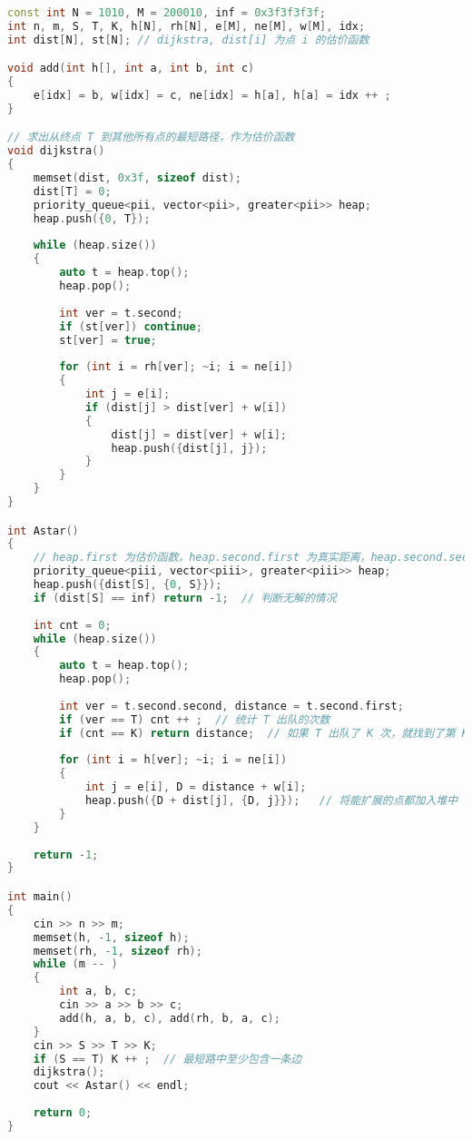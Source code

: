 \begin{lstlisting}[language=cpp]
const int N = 1010, M = 200010, inf = 0x3f3f3f3f;
int n, m, S, T, K, h[N], rh[N], e[M], ne[M], w[M], idx;
int dist[N], st[N]; // dijkstra, dist[i] 为点 i 的估价函数

void add(int h[], int a, int b, int c)
{
    e[idx] = b, w[idx] = c, ne[idx] = h[a], h[a] = idx ++ ;
}

// 求出从终点 T 到其他所有点的最短路径，作为估价函数
void dijkstra()
{
    memset(dist, 0x3f, sizeof dist);
    dist[T] = 0;
    priority_queue<pii, vector<pii>, greater<pii>> heap;
    heap.push({0, T});
    
    while (heap.size())
    {
        auto t = heap.top();
        heap.pop();
        
        int ver = t.second;
        if (st[ver]) continue;
        st[ver] = true;
        
        for (int i = rh[ver]; ~i; i = ne[i])
        {
            int j = e[i];
            if (dist[j] > dist[ver] + w[i])
            {
                dist[j] = dist[ver] + w[i];
                heap.push({dist[j], j});
            }
        }
    }
}

int Astar()
{
    // heap.first 为估价函数，heap.second.first 为真实距离，heap.second.second 为当前点的编号
    priority_queue<piii, vector<piii>, greater<piii>> heap;
    heap.push({dist[S], {0, S}});
    if (dist[S] == inf) return -1;  // 判断无解的情况
    
    int cnt = 0;
    while (heap.size())
    {
        auto t = heap.top();
        heap.pop();
        
        int ver = t.second.second, distance = t.second.first;
        if (ver == T) cnt ++ ;  // 统计 T 出队的次数
        if (cnt == K) return distance;  // 如果 T 出队了 K 次，就找到了第 K 短路
        
        for (int i = h[ver]; ~i; i = ne[i])
        {
            int j = e[i], D = distance + w[i];
            heap.push({D + dist[j], {D, j}});   // 将能扩展的点都加入堆中
        }
    }
    
    return -1;
}

int main()
{
    cin >> n >> m;
    memset(h, -1, sizeof h);
    memset(rh, -1, sizeof rh);
    while (m -- )
    {
        int a, b, c;
        cin >> a >> b >> c;
        add(h, a, b, c), add(rh, b, a, c);
    }
    cin >> S >> T >> K;
    if (S == T) K ++ ;  // 最短路中至少包含一条边
    dijkstra();
    cout << Astar() << endl;
    
    return 0;
}
\end{lstlisting}